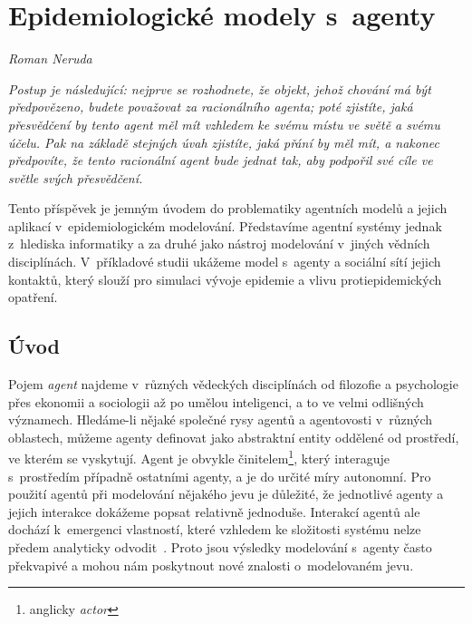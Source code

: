 
\chapter{Epidemiologické modely s~agenty}\label{Modely_Agenty}
\label{Agentni_modely}
\textit{Roman Neruda}
\vspace{15mm}


\setlength{\epigraphrule}{0pt}
\setlength{\epigraphwidth}{.6\textwidth}
\epigraph{\textit{\flushepinormal
Postup je následující: nejprve se rozhodnete, že objekt, jehož chování má být předpovězeno, budete považovat za racionálního agenta; poté zjistíte, jaká přesvědčení by tento agent měl mít vzhledem ke svému místu ve světě a svému účelu. Pak na základě stejných úvah zjistíte, jaká přání by měl mít, a nakonec předpovíte, že tento racionální agent bude jednat tak, aby podpořil své cíle ve světle svých přesvědčení.}} 
{\cite{Dennett87}}


Tento příspěvek je jemným úvodem do problematiky agentních modelů a jejich aplikací v~epidemiologickém modelování. Představíme agentní systémy jednak z~hlediska informatiky a za druhé jako nástroj modelování v~jiných vědních disciplínách. V~příkladové studii ukážeme model s~agenty a sociální sítí jejich kontaktů, který slouží pro simulaci vývoje epidemie a vlivu protiepidemických opatření.

\section*{Úvod} 

Pojem \emph{agent} najdeme v~různých vědeckých disciplínách od filozofie a psychologie přes ekonomii a sociologii až po umělou inteligenci, a to ve velmi odlišných významech. Hledáme-li nějaké společné rysy agentů a agentovosti v~různých oblastech, můžeme agenty definovat jako abstraktní entity oddělené od prostředí, ve kterém se vyskytují. Agent je obvykle činitelem\footnote{anglicky \emph{actor}}, který interaguje s~prostředím případně ostatními agenty, a je do určité míry autonomní. Pro použití agentů při modelování nějakého jevu je důležité, že jednotlivé agenty a jejich interakce dokážeme popsat relativně jednoduše. Interakcí agentů ale dochází k~emergenci vlastností, které vzhledem ke složitosti systému nelze předem analyticky odvodit~\cite{Symons18}. Proto jsou výsledky modelování s~agenty často překvapivé a mohou nám poskytnout nové znalosti o~modelovaném jevu. 

